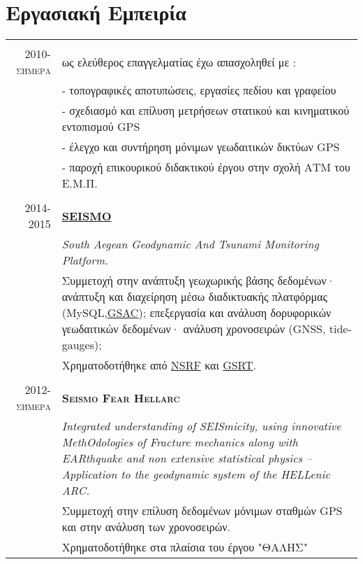 \documentclass[a4paper,10pt]{article} %
\begin{document}

\section{Εργασιακή Εμπειρία}

\begin{longtable}{r|p{13cm}}

\multicolumn{2}{c}{} \\
\textsc{2010-σήμερα} & ως ελεύθερος επαγγελματίας έχω απασχοληθεί με :\\ 
  & - τοπογραφικές αποτυπώσεις, εργασίες πεδίου και γραφείου \\
  & - σχεδιασμό και επίλυση μετρήσεων στατικού και κινηματικού εντοπισμού GPS\\
  & - έλεγχο και συντήρηση μόνιμων γεωδαιτικών δικτύων GPS\\
  & - παροχή επικουρικού διδακτικού έργου στην σχολή ΑΤΜ του Ε.Μ.Π. \\

\multicolumn{2}{c}{} \\
\textsc{2014-2015} & \textbf{\textsc{\href{http://dionysos.survey.ntua.gr/SEISMO/index.html}{SEISMO}}}\\
  & \textit{South Aegean Geodynamic And Tsunami Monitoring Platform.}\\
  & Συμμετοχή στην ανάπτυξη γεωχωρικής βάσης δεδομένων· ανάπτυξη και διαχείρηση μέσω διαδικτυακής πλατφόρμας (MySQL,\href{http://www.unavco.org/software/data-management/gsac/gsac.html}{GSAC});
    επεξεργασία και ανάλυση δορυφορικών γεωδαιτικών δεδομένων· ανάλυση χρονοσειρών (GNSS, tide-gauges); \\
  & Χρηματοδοτήθηκε από \href{http://www.espa.gr/en/Pages/Default.aspx}{NSRF} και \href{http://www.gsrt.gr/central.aspx?sId=119I428I1089I323I488743}{GSRT}.\\

\multicolumn{2}{c}{} \\
\textsc{2012-σήμερα} & \textbf{\textsc{Seismo Fear Hellarc}}\\
  & \textit{Integrated understanding of SEISmicity, using innovative MethOdologies of Fracture mechanics along with EARthquake and non extensive statistical physics – Application to the geodynamic system of the HELLenic ARC.}\\
  & Συμμετοχή στην επίλυση δεδομένων μόνιμων σταθμών GPS και στην ανάλυση των χρονοσειρών.\\
  & Χρηματοδοτήθηκε στα πλαίσια του έργου "ΘΑΛΗΣ"\\


\end{longtable}
\end{document}
